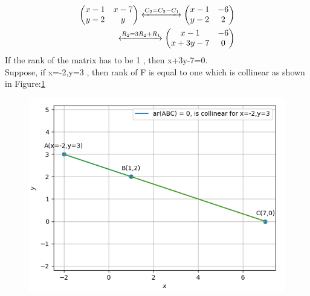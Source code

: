 \documentclass[12pt]{article}
\newcommand{\myvec}[1]{\ensuremath{\begin{pmatrix}#1\end{pmatrix}}}
\begin{document}
\begin{align}
\label{eq:chem_balance_mat_row}
\myvec{
x-1 & x-7
\\
y-2 & y
}
 \xleftrightarrow[]{C_2 = C_2-C_1}
\myvec{
x-1 & -6
\\
y-2 & 2
}
\\
 \xleftrightarrow[]{R_2 = 3R_2+R_1}
\myvec{
x-1 & -6
\\
x+3y-7 & 0
}
\end{align}
If the rank of the matrix has to be 1 , then x+3y-7=0.
\\	Suppose, if x=-2,y=3 , then rank of F is equal to one which is collinear as shown in Figure:\ref{fig:Fig}
\begin{figure}[!h]
	\begin{center} 
	    \includegraphics[width=\columnwidth]{./figs/sc1.png}
	\end{center}
\caption{}
\label{fig:Fig}
\end{figure}
\end{document}
